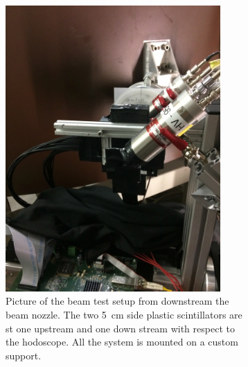 \begin{figure}[!htbp]
\begin{subfigure}[t]{.5\textwidth}
\centering
\includegraphics[width=0.9\textwidth]{03_GraphicFiles/chapter6_BeamTests/Nice_May2018/IMG_5181.jpg}
\caption{Picture of the beam test setup from downstream the beam nozzle. The two 5~cm side plastic scintillators are st one upstream and one down stream with respect to the hodoscope. All the system is mounted on a custom support.}
\label{chap6::fig::May_HodoSetupPicture2}
\end{subfigure}
\begin{subfigure}[t]{.5\textwidth}
\centering

\end{subfigure}
\end{figure}
